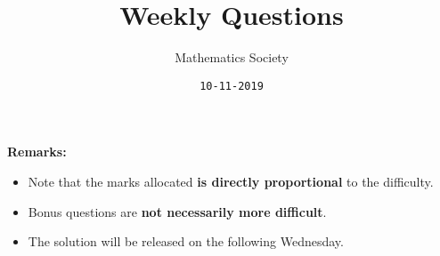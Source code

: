 \documentclass[addpoints]{exam}
\title{Weekly Questions}
\author{Mathematics Society}
\date{\texttt{10-11-2019}}
\begin{document}


\maketitle


\textbf{Remarks:}
\begin{itemize}
    \item Note that the marks allocated \textbf{is directly proportional} to the difficulty.
    \item Bonus questions are \textbf{not necessarily more difficult}.
    \item The solution will be released on the following Wednesday.
\end{itemize}



\end{document}

